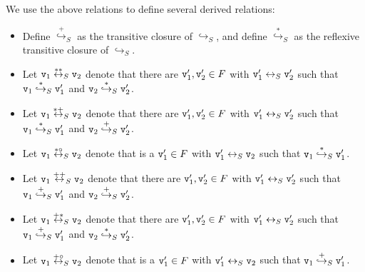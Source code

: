 We use the above relations to define several derived relations:
\begin{itemize}
\item Define $\overset{+}\hookrightarrow_S$ as the transitive closure of
  $\hookrightarrow_S$, and define
   $\overset{*}\hookrightarrow_S$ as the reflexive transitive closure of
$\hookrightarrow_S$.
\item Let $\mathtt{v}_1  \overset{**}\leftrightarrow_S  \mathtt{v}_2$ denote that there are
  $\mathtt{v}_1',\mathtt{v}_2' \in F$ with $\mathtt{v}_1' \leftrightarrow_S \mathtt{v}_2'$ such that
  $\mathtt{v}_1  \overset{*}\hookrightarrow_S \mathtt{v}_1'$ and $\mathtt{v}_2  \overset{*}\hookrightarrow_S \mathtt{v}_2'$.
\item Let $\mathtt{v}_1  \overset{*+}\leftrightarrow_S  \mathtt{v}_2$ denote that there are
  $\mathtt{v}_1', \mathtt{v}_2' \in F$ with $\mathtt{v}_1' \leftrightarrow_S \mathtt{v}_2'$ such that
  $\mathtt{v}_1  \overset{*}\hookrightarrow_S \mathtt{v}_1'$ and $\mathtt{v}_2  \overset{+}\hookrightarrow_S \mathtt{v}_2'$.
\item Let $\mathtt{v}_1  \overset{*\circ}\leftrightarrow_S  \mathtt{v}_2$ denote that is a
  $\mathtt{v}_1' \in F$ with $\mathtt{v}_1' \leftrightarrow_S \mathtt{v}_2$ such that
  $\mathtt{v}_1  \overset{*}\hookrightarrow_S \mathtt{v}_1'$.
\item Let $\mathtt{v}_1  \overset{++}\leftrightarrow_S  \mathtt{v}_2$ denote that there are
  $\mathtt{v}_1',\mathtt{v}_2' \in F$ with $\mathtt{v}_1' \leftrightarrow_S \mathtt{v}_2'$ such that
  $\mathtt{v}_1  \overset{+}\hookrightarrow_S \mathtt{v}_1'$ and $\mathtt{v}_2  \overset{+}\hookrightarrow_S \mathtt{v}_2'$.
\item Let $\mathtt{v}_1  \overset{+*}\leftrightarrow_S  \mathtt{v}_2$ denote that there are
  $\mathtt{v}_1', \mathtt{v}_2' \in F$ with $\mathtt{v}_1' \leftrightarrow_S \mathtt{v}_2'$ such that
  $\mathtt{v}_1  \overset{+}\hookrightarrow_S \mathtt{v}_1'$ and $\mathtt{v}_2  \overset{*}\hookrightarrow_S \mathtt{v}_2'$.
\item Let $\mathtt{v}_1  \overset{+\circ}\leftrightarrow_S  \mathtt{v}_2$ denote that is a
  $\mathtt{v}_1' \in F$ with $\mathtt{v}_1' \leftrightarrow_S \mathtt{v}_2$ such that
  $\mathtt{v}_1  \overset{+}\hookrightarrow_S \mathtt{v}_1'$.
\end{itemize}


